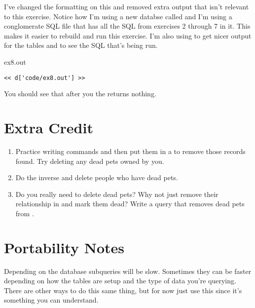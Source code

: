 I've changed the formatting on this and removed extra output that isn't
relevant to this exercise.  Notice how I'm using a new databse called
 and I'm using a conglomerate SQL file that has all the
SQL from exercises 2 through 7 in it.  This makes it easier to rebuild
and run this exercise.  I'm also using 
to get nicer output for the tables and to see the SQL that's being run.

\begin{code}{ex8.out}
\begin{Verbatim}
<< d['code/ex8.out'] >>
\end{Verbatim}
\end{code}

You should see that after you  the  returns
nothing.

\section{Extra Credit}

\begin{enumerate}
\item Practice writing  commands and then put them in a
     to remove those records found.  Try
    deleting any dead pets owned by you.
\item Do the inverse and delete people who have dead pets.
\item Do you really need to delete dead pets?  Why not just remove their
    relationship in  and mark them dead?  Write a 
    query that removes dead pets from .
\end{enumerate}

\section{Portability Notes}

Depending on the database subqueries will be slow.  Sometimes they can be
faster depending on how the tables are setup and the type of data you're
querying.  There are other ways to do this same thing, but for now just
use this since it's something you can understand.
